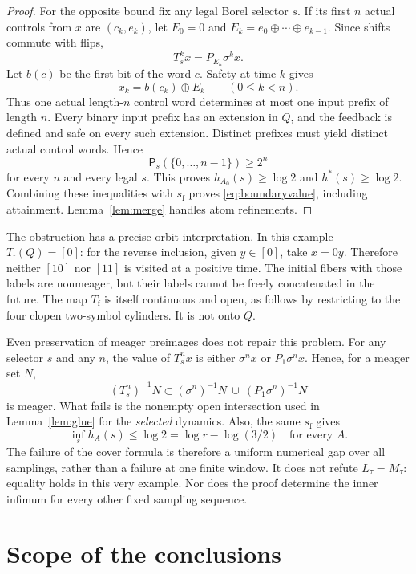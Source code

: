 \documentclass[11pt,reqno]{amsart}
\numberwithin{equation}{section}
\theoremstyle{definition}
\theoremstyle{remark}
\newcommand{\Patt}{\mathsf P}
\newcommand{\hpat}{h^{*}}
\begin{document}
\begin{proof}
For the opposite bound fix any legal Borel selector $s$. If its first
$n$ actual controls from $x$ are $(c_k,e_k)$, let
$E_0=0$ and $E_k=e_0\oplus\cdots\oplus e_{k-1}$. Since shifts commute
with flips,
\[
 T_s^k x=P_{E_k}\sigma^k x.
\]
Let $b(c)$ be the first bit of the word $c$. Safety at time $k$ gives
\begin{equation}\label{eq:decode}
 x_k=b(c_k)\oplus E_k\qquad(0\le k<n).
\end{equation}
Thus one actual length-$n$ control word determines at most one input
prefix of length $n$. Every binary input prefix has an extension in
$Q$, and the feedback is defined and safe on every such extension.
Distinct prefixes must yield distinct actual control words. Hence
\[
 \Patt_s(\{0,\ldots,n-1\})\ge2^n
\]
for every $n$ and every legal $s$. This proves $h_{A_0}(s)\ge\log2$
and $\hpat(s)\ge\log2$. Combining these inequalities with
$s_{\mathrm f}$ proves \eqref{eq:boundaryvalue}, including attainment.
Lemma~\ref{lem:merge} handles atom refinements.
\end{proof}

The obstruction has a precise orbit interpretation. In this example
$T_{\mathrm f}(Q)=[0]$: for the reverse inclusion, given $y\in[0]$,
take $x=0y$. Therefore neither $[10]$ nor $[11]$ is visited at a
positive time. The initial fibers with those labels are nonmeager,
but their labels cannot be freely concatenated in the future.
The map $T_{\mathrm f}$ is itself continuous and open, as follows by
restricting to the four clopen two-symbol cylinders. It is not onto
$Q$.

Even preservation of meager preimages does not repair this problem.
For any selector $s$ and any $n$, the value of $T_s^n x$ is either
$\sigma^n x$ or $P_1\sigma^n x$. Hence, for a meager set $N$,
\[
 (T_s^n)^{-1}N\subset
 (\sigma^n)^{-1}N\ \cup\ (P_1\sigma^n)^{-1}N
\]
is meager. What fails is the nonempty open intersection used in
Lemma~\ref{lem:glue} for the \emph{selected} dynamics. Also, the
same $s_{\mathrm f}$ gives
\[
 \inf_s h_A(s)\le\log2=\log r-\log(3/2)
 \quad\text{for every }A.
\]
The failure of the cover formula is therefore a uniform numerical
gap over all samplings, rather than a failure at one finite window.
It does not refute $L_\tau=M_\tau$: equality holds in this very example.
Nor does the proof determine the inner infimum for every other fixed
sampling sequence.

\section{Scope of the conclusions}
\end{document}
